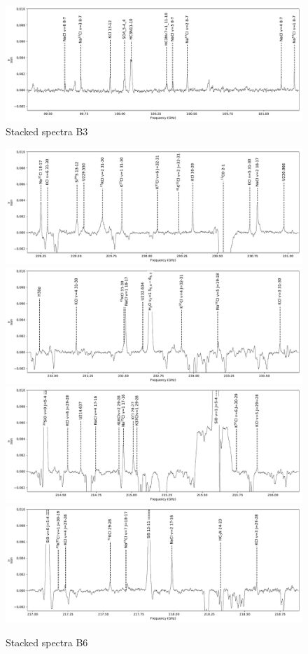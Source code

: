 \documentclass[twocolumn]{aastex62}
\begin{document}
\begin{figure}[!htp]
\includegraphics[scale=1,width=5.5in]{figures/lines_labeled_OrionSourceI_B3_spw3_robust0.5.pdf}
\caption{Stacked spectra  B3}
\label{fig:spectrab3}
\end{figure}
\begin{figure}[!htp]
\includegraphics[scale=1,width=5.5in]{figures/lines_labeled_OrionSourceI_B6_spw0_robust0.5.pdf}
\includegraphics[scale=1,width=5.5in]{figures/lines_labeled_OrionSourceI_B6_spw1_robust0.5.pdf}
\includegraphics[scale=1,width=5.5in]{figures/lines_labeled_OrionSourceI_B6_spw2_robust0.5.pdf}
\includegraphics[scale=1,width=5.5in]{figures/lines_labeled_OrionSourceI_B6_spw3_robust0.5.pdf}
\caption{Stacked spectra B6}
\label{fig:spectrab6}
\end{figure}
\end{document}
